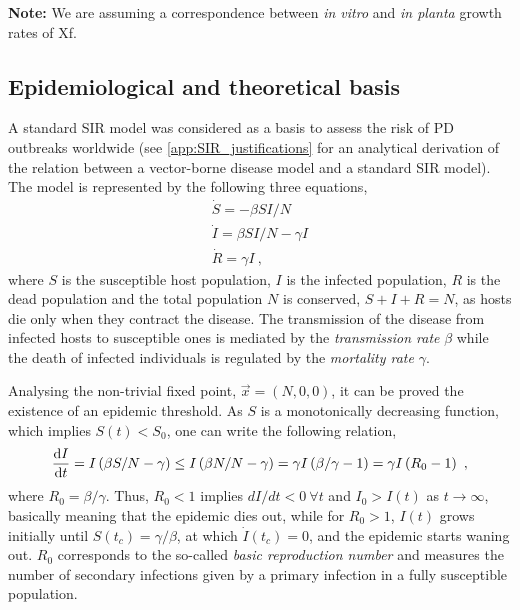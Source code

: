 \textbf{Note:} We are assuming a correspondence between \textit{in vitro}
and \textit{in planta} growth rates of Xf.

\subsection{Epidemiological and theoretical basis}\label{app:SIR}

A standard SIR model was considered as a basis to assess the risk of PD
outbreaks worldwide (see \cref{app:SIR_justifications} for an analytical
derivation of the relation between a vector-borne disease model and a standard
SIR model). The model is represented by the following three equations,
\begin{equation}
    \begin{array}{l}
        \dot{S}=-\beta SI/N           \\
        \dot{I}=\beta SI/N - \gamma I \\
        \dot{R}=\gamma I \ ,
    \end{array}
    \label{eq:SIRmodel}
\end{equation}
where $S$ is the susceptible host population, $I$ is the infected
population, $R$ is the dead population and the total population $N$ is
conserved, $S+I+R=N$, as hosts die only when they contract the disease.
The transmission of the disease from infected hosts to susceptible ones is
mediated by the \textit{transmission rate} $\beta$ while the death of infected
individuals is regulated by the \textit{mortality rate} $\gamma$.

Analysing the non-trivial fixed point, $\vec{x}=(N, 0, 0)$, it can be
proved the existence of an epidemic threshold. As $S$ is a monotonically
decreasing function, which implies $S(t)<S_0$, one can write the following
relation,
\begin{equation}\label{eq: threshold_t}
    \frac{\mathrm{d} I}{\mathrm{d} t}=I\left(\beta S/N-\gamma\right)\leq I\left(\beta
        N/N-\gamma\right)=\gamma I\left(\beta/\gamma-1\right)=\gamma
    I\left(R_0-1\right) \ ,
\end{equation}
where $R_0= \beta/\gamma$. Thus, $R_0<1$ implies $dI/dt<0 \ \forall t$ and
$I_0>I(t)$ as $t\to\infty$, basically meaning that the epidemic dies out, while
for $R_0>1$, $I(t)$ grows initially until $S(t_c)=\gamma/\beta$, at which
$\dot{I}(t_c)=0$, and the epidemic starts waning out.
$R_0$ corresponds to the so-called \textit{basic reproduction number} and
measures the number of secondary infections given by a primary infection in a
fully susceptible population.


